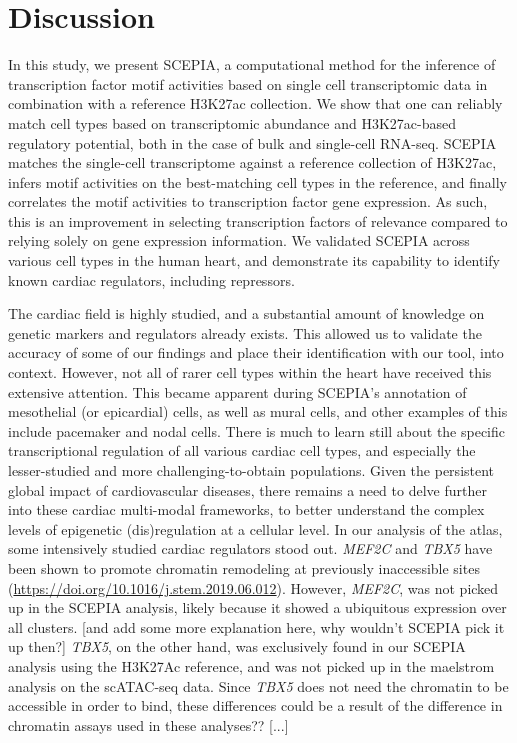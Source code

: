 \section{Discussion}

In this study, we present SCEPIA, a computational method for the inference of transcription factor motif activities based on single cell transcriptomic data in combination with a reference H3K27ac collection. We show that one can reliably match cell types based on transcriptomic abundance and H3K27ac-based regulatory potential\cite{Wang2016}, both in the case of bulk and single-cell RNA-seq. SCEPIA matches the single-cell transcriptome against a reference collection of H3K27ac, infers motif activities on the best-matching cell types in the reference, and finally correlates the motif activities to transcription factor gene expression. As such, this is an improvement in selecting transcription factors of relevance compared to relying solely on gene expression information. We validated SCEPIA across various cell types in the human heart, and demonstrate its capability to identify known cardiac regulators, including repressors. 

The cardiac field is highly studied, and a substantial amount of knowledge on genetic markers and regulators already exists. This allowed us to validate the accuracy of some of our findings and place their identification with our tool, into context. However, not all of rarer cell types within the heart have received this extensive attention. This became apparent during SCEPIA's annotation of mesothelial (or epicardial) cells, as well as mural cells, and other examples of this include pacemaker and nodal cells. There is much to learn still about the specific transcriptional regulation of all various cardiac cell types, and especially the lesser-studied and more challenging-to-obtain populations. Given the persistent global impact of cardiovascular diseases\cite{Tsao2023}, there remains a need to delve further into these cardiac multi-modal frameworks, to better understand the complex levels of epigenetic (dis)regulation at a cellular level. In our analysis of the atlas, some intensively studied cardiac regulators stood out. \textit{MEF2C} and \textit{TBX5} have been shown to promote chromatin remodeling at previously inaccessible sites (\href{https://doi.org/10.1016/j.stem.2019.06.012}{https://doi.org/10.1016/j.stem.2019.06.012}). However,  \textit{MEF2C}, was not picked up in the SCEPIA analysis, likely because it showed a ubiquitous expression over all clusters. [and add some more explanation here, why wouldn't SCEPIA pick it up then?] \textit{TBX5}, on the other hand, was exclusively found in our SCEPIA analysis using the H3K27Ac reference, and was not picked up in the maelstrom analysis on the scATAC-seq data. Since \textit{TBX5} does not need the chromatin to be accessible in order to bind, these differences could be a result of the difference in chromatin assays used in these analyses?? [...]
 
